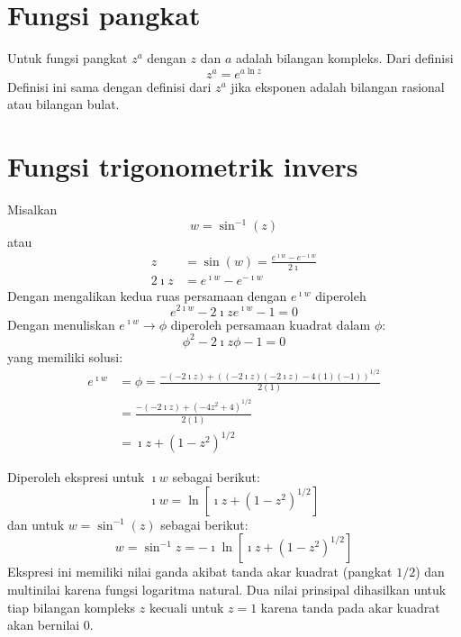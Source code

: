 \section{Fungsi pangkat}

Untuk fungsi pangkat $z^{a}$ dengan $z$ dan $a$ adalah bilangan
kompleks. Dari definisi
\begin{equation}
z^{a} = e^{a\ln z}
\label{eq:pangkat-kompleks}
\end{equation}
Definisi ini sama dengan definisi dari $z^{a}$ jika eksponen adalah
bilangan rasional atau bilangan bulat.



\section{Fungsi trigonometrik invers}

Misalkan
\begin{equation*}
w = \sin^{-1}(z)
\end{equation*}
atau
\begin{align*}
z & = \sin(w) = \frac{e^{\imath w} - e^{-\imath  w}}{2\imath} \\
2\imath z & = e^{\imath w}-e^{-\imath w}
\end{align*}
Dengan mengalikan kedua ruas persamaan dengan $e^{\imath w}$ diperoleh
\begin{equation*}
e^{2\imath w} - 2 \imath ze^{\imath w} - 1 = 0
\end{equation*}
Dengan menuliskan $e^{\imath w} \rightarrow \phi$ diperoleh persamaan
kuadrat dalam $\phi$:
\begin{equation*}
\phi^{2} - 2\imath z\phi - 1 = 0
\end{equation*}
yang memiliki solusi:
\begin{align*}
e^{\imath w} & = \phi = \frac{-(-2\imath z)+\left((-2\imath z)(-2\imath z)-4(1)(-1)\right)^{1/2}}{2(1)}\\
 & =\frac{-(-2\imath z)+\left( -4z^{2} + 4 \right)^{1/2}}{2(1)}\\
 & =\imath z+\left(1-z^{2}\right)^{1/2}
\end{align*}

Diperoleh ekspresi untuk $\imath w$ sebagai berikut:
\begin{equation*}
\imath w=\ln\left[\imath z+\left(1-z^{2}\right)^{1/2}\right]
\end{equation*}
dan untuk $w = \sin^{-1}(z)$ sebagai berikut:
\begin{equation}
w = \sin^{-1}z = -\imath \ln\left[\imath z + \left(1 - z^{2}\right)^{1/2}\right]
\end{equation}
Ekspresi ini memiliki nilai ganda akibat tanda akar kuadrat
(pangkat $1/2$) dan multinilai karena fungsi logaritma natural. Dua nilai
prinsipal dihasilkan untuk tiap bilangan kompleks $z$ kecuali untuk
$z=1$ karena tanda pada akar kuadrat akan bernilai 0.

